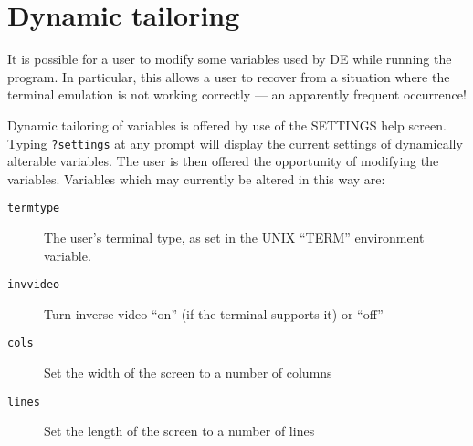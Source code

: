 \section{Dynamic tailoring}

It is possible for a user to modify some variables used by DE while
running the program.  In particular, this allows a user to recover from a
situation where the terminal emulation is not working correctly --- an
apparently frequent occurrence!

Dynamic tailoring of variables is offered by use of the SETTINGS help screen.
Typing {\tt ?settings} at any prompt will display the current settings of
dynamically alterable variables.  The user is then offered the opportunity
of modifying the variables.  Variables which may currently be altered in
this way are:

\begin{description}

\item [\verb+termtype+] The user's terminal type, as set in the UNIX ``TERM''
environment variable.

\item [\verb+invvideo+] Turn inverse video ``on'' (if the terminal 
supports it) or ``off''

\item [\verb+cols+] Set the width of the screen to a number of columns

\item [\verb+lines+] Set the length of the screen to a number of lines

\end{description}
